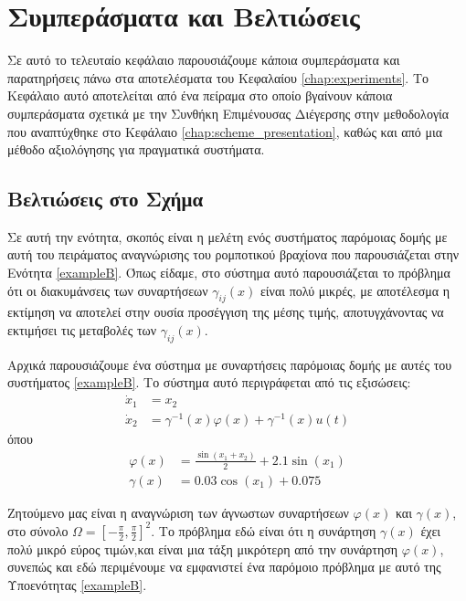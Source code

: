 \chapter{Συμπεράσματα και Βελτιώσεις}
\label{chap:conclusions}
Σε αυτό το τελευταίο κεφάλαιο παρουσιάζουμε κάποια συμπεράσματα και παρατηρήσεις πάνω στα αποτελέσματα του Κεφαλαίου \ref{chap:experiments}. Το Κεφάλαιο αυτό αποτελείται από ένα πείραμα στο οποίο βγαίνουν κάποια συμπεράσματα σχετικά με την Συνθήκη Επιμένουσας Διέγερσης στην μεθοδολογία που αναπτύχθηκε στο Κεφάλαιο \ref{chap:scheme_presentation}, καθώς και από μια μέθοδο αξιολόγησης για πραγματικά συστήματα.



\section{Βελτιώσεις στο Σχήμα}
Σε αυτή την ενότητα, σκοπός είναι η μελέτη ενός συστήματος παρόμοιας δομής με αυτή του πειράματος αναγνώρισης του ρομποτικού βραχίονα που παρουσιάζεται στην Ενότητα \ref{exampleB}. Όπως είδαμε, στο σύστημα αυτό παρουσιάζεται το πρόβλημα ότι οι διακυμάνσεις των συναρτήσεων $\gamma_{ij}(x)$ είναι πολύ μικρές, με αποτέλεσμα η εκτίμηση να αποτελεί στην ουσία προσέγγιση της μέσης τιμής, αποτυγχάνοντας να εκτιμήσει τις μεταβολές των $\gamma_{ij}(x)$.

Αρχικά παρουσιάζουμε ένα σύστημα με συναρτήσεις παρόμοιας δομής με αυτές του συστήματος \ref{exampleB}. Το σύστημα αυτό περιγράφεται από τις εξισώσεις:
\begin{equation}
\label{eq:robotic_equiv_plant_form}
\begin{split}
\dot{x}_1 &= x_{2}  \\
\dot{x}_2 &= \gamma^{-1}(x)\varphi(x)+\gamma^{-1}(x)u(t)
\end{split}
\end{equation}
όπου
\begin{equation*}
\begin{split}
\varphi(x) &= \frac{\sin(x_1 + x_2)}{2} + 2.1 \sin(x_1) \\ 
\gamma(x) &= 0.03 \cos(x_1) + 0.075
\end{split}
\end{equation*}

Ζητούμενο μας είναι η αναγνώριση των άγνωστων συναρτήσεων $\varphi(x)$ και $\gamma(x)$, στο σύνολο $\Omega = [-\frac{\pi}{2},\frac{\pi}{2}]^2$. Το πρόβλημα εδώ είναι ότι η συνάρτηση $\gamma(x)$ έχει πολύ μικρό εύρος τιμών,και είναι μια τάξη μικρότερη από την συνάρτηση $\varphi(x)$, συνεπώς και εδώ περιμένουμε να εμφανιστεί ένα παρόμοιο πρόβλημα με αυτό της Υποενότητας \ref{exampleB}.

